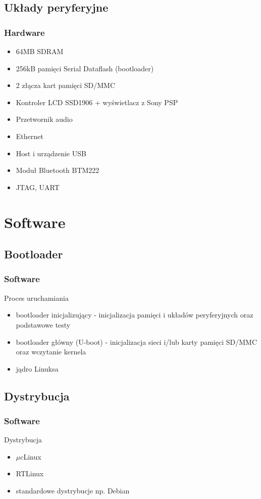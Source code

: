 \documentclass{beamer}
\newenvironment{ramka}{\begin{frame}}
{
		\end{frame}
}
\begin{document}
	\subsection{Układy peryferyjne}
	\begin{ramka}
		\frametitle{Hardware}
		\begin{itemize}
			\item<1-> 64MB SDRAM
			\item<1-> 256kB pamięci Serial Dataflash (bootloader)
			\item<1-> 2 złącza kart pamięci SD/MMC
			\item<1-> Kontroler LCD SSD1906 + wyświetlacz z Sony PSP
			\item<1-> Przetwornik audio
			\item<1-> Ethernet
			\item<1-> Host i urządzenie USB
			\item<1-> Moduł Bluetooth BTM222
			\item<1-> JTAG, UART
		\end{itemize}
	\end{ramka} 
	
	\section{Software}
	\subsection{Bootloader}
	\begin{ramka}
		\frametitle{Software}
		\begin{block}{Proces uruchamiania}
			\begin{itemize}
				\item<2-> bootloader inicjalizujący - inicjalizacja pamięci i układów peryferyjnych oraz podstawowe testy
				\item<3-> bootloader główny (U-boot) - inicjalizacja sieci i/lub karty pamięci SD/MMC oraz wczytanie kernela
				\item<4-> jądro Linuksa
			\end{itemize}
		\end{block}
	\end{ramka}
	
	\subsection{Dystrybucja}
	\begin{ramka}
		\frametitle{Software}
		\begin{block}{Dystrybucja}
			\begin{itemize}
				\item<1-> $\mu$cLinux
				\item<1-> RTLinux
				\item<1-> standardowe dystrybucje np. Debian
			\end{itemize}
		\end{block}
	\end{ramka}
	
\end{document}

